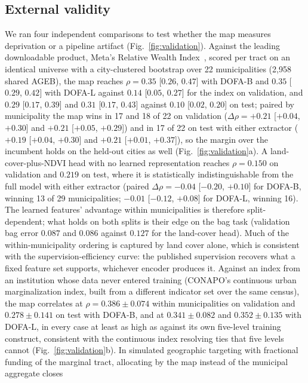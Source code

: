 \documentclass[11pt]{article}
\begin{document}
\subsection{External validity}

We ran four independent comparisons to test whether the map measures deprivation or a
pipeline artifact (Fig.~\ref{fig:validation}). Against the leading downloadable product,
Meta's Relative Wealth Index~\cite{chi2022}, scored per tract on an identical universe
with a city-clustered bootstrap over 22 municipalities (2{,}958 shared AGEB), the map
reaches $\rho = 0.35$ [$0.26$, $0.47$] with DOFA-B and $0.35$ [$0.29$, $0.42$] with
DOFA-L against $0.14$ [$0.05$, $0.27$] for the index on validation, and $0.29$ [$0.17$,
$0.39$] and $0.31$ [$0.17$, $0.43$] against $0.10$ [$0.02$, $0.20$] on test; paired by
municipality the map wins in 17 and 18 of 22 on validation
($\Delta\rho = +0.21$ [$+0.04$, $+0.30$] and $+0.21$ [$+0.05$, $+0.29$]) and in 17 of 22
on test with either extractor ($+0.19$ [$+0.04$, $+0.30$] and $+0.21$ [$+0.01$,
$+0.37$]), so the margin over the incumbent holds on the held-out cities as well
(Fig.~\ref{fig:validation}a). A land-cover-plus-NDVI head with no learned
representation reaches $\rho = 0.150$ on validation and $0.219$ on test, where it is
statistically indistinguishable from the full model with either extractor (paired
$\Delta\rho = -0.04$ [$-0.20$, $+0.10$] for DOFA-B, winning 13 of 29 municipalities;
$-0.01$ [$-0.12$, $+0.08$] for DOFA-L, winning 16). The learned features' advantage
within municipalities is therefore split-dependent; what holds on both splits is their
edge on the bag task (validation bag error $0.087$ and $0.086$ against $0.127$ for the
land-cover head). Much of the within-municipality ordering is captured by land cover alone,
which is consistent with the supervision-efficiency curve: the published supervision
recovers what a fixed feature set supports, whichever encoder produces it. Against an
index from an institution whose data never entered training (CONAPO's continuous urban
marginalization index, built from a different indicator set over the same census), the
map correlates at $\rho = 0.386 \pm 0.074$ within municipalities on validation and
$0.278 \pm 0.141$ on test with DOFA-B, and at $0.341 \pm 0.082$ and $0.352 \pm 0.135$
with DOFA-L, in every case at least as high as against its own five-level training
construct, consistent with the continuous index resolving ties that five levels cannot
(Fig.~\ref{fig:validation}b). In simulated geographic targeting with fractional funding
of the marginal tract, allocating by the map instead of the municipal aggregate closes
\end{document}
